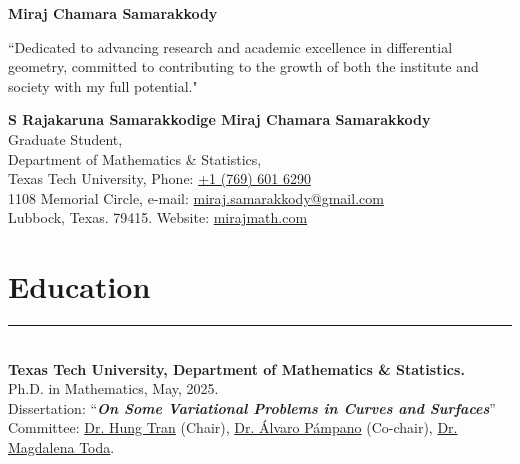 \documentclass[12pt]{book}
\begin{document}
\pagestyle{fancy}
\thispagestyle{empty}
\begin{center}
\textbf{\Huge{Miraj Chamara Samarakkody}}\\
\end{center}

``Dedicated to advancing research and academic excellence in differential geometry, committed to contributing to the growth of both the institute and society with my full potential."\\
\vspace{0.05in}

\noindent \textbf{S Rajakaruna Samarakkodige Miraj Chamara Samarakkody}\\
Graduate Student,  \\
Department of Mathematics \& Statistics,    \\
Texas Tech University, \hfill Phone: \href{tel:+17696016290}{+1 (769) 601 6290}\\
1108 Memorial Circle,  \hfill e-mail: \href{mailto:miraj.samarakkody@gmail.com}{miraj.samarakkody@gmail.com}\\
Lubbock, Texas. 79415.  \hfill Website: \href{https://mirajmath.com}{mirajmath.com}\\



\section*{Education} \rule{\textwidth}{1pt}\\

\noindent \textbf{Texas Tech University, Department of Mathematics \& Statistics.}\\
Ph.D. in Mathematics, May, 2025. \\
Dissertation: ``\textit{\textbf{On Some Variational Problems in Curves and Surfaces}}''\\
Committee:  \href{https://www.myweb.ttu.edu/tra97432/}{Dr. Hung Tran} (Chair), \href{https://www.math.ttu.edu/~apampano/}{Dr. \'Alvaro P\'ampano} (Co-chair), \href{https://www.math.ttu.edu/~mtoda/}{Dr. Magdalena Toda}.\\
\end{document}
